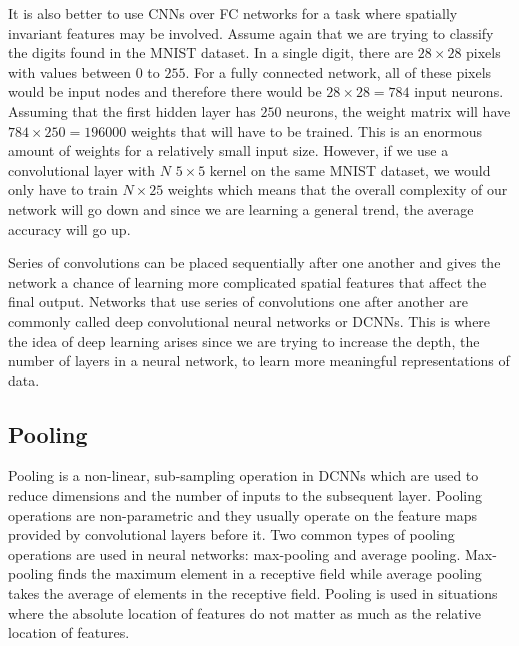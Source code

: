 It is also better to use CNNs over FC networks for a task where spatially invariant features may be involved. Assume again that we are trying to classify the digits found in the MNIST dataset. In a single digit, there are $28 \times 28$ pixels with values between $0$ to $255$. For a fully connected network, all of these pixels would be input nodes and therefore there would be $28 \times 28 = 784$ input neurons. Assuming that the first hidden layer has $250$ neurons, the weight matrix will have $784 \times 250 = 196000$ weights that will have to be trained. This is an enormous amount of weights for a relatively small input size. However, if we use a convolutional layer with $N$  $5 \times 5$ kernel on the same MNIST dataset, we would only have to train $N \times 25$ weights which means that the overall complexity of our network will go down and since we are learning a general trend, the average accuracy will go up. 

Series of convolutions can be placed sequentially after one another and gives the network a chance of learning more complicated spatial features that affect the final output. Networks that use series of convolutions one after another are commonly called deep convolutional neural networks or DCNNs. This is where the idea of deep learning arises since we are trying to increase the depth, the number of layers in a neural network, to learn more meaningful representations of data. 


\subsection{Pooling}
Pooling is a non-linear, sub-sampling operation in DCNNs which are used to reduce dimensions and the number of inputs to the subsequent layer. Pooling operations are non-parametric and they usually operate on the feature maps provided by convolutional layers before it. Two common types of pooling operations are used in neural networks: max-pooling and average pooling. Max-pooling \cite{scherer2010evaluation} finds the maximum element in a receptive field while average pooling takes the average of elements in the receptive field. Pooling is used in situations where the absolute location of features do not matter as much as the relative location of features.

